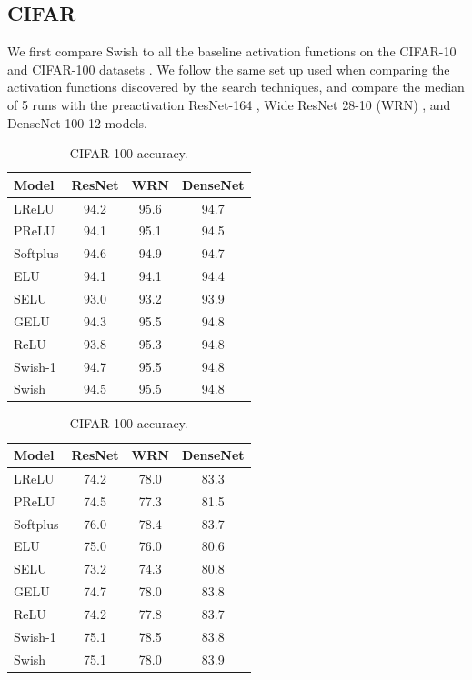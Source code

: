 \documentclass{article} %
\begin{document}
\subsection{CIFAR}
\label{ssec:experiments-cifar}

We first compare Swish to all the baseline activation functions on the CIFAR-10 and CIFAR-100 datasets \citep{krizhevsky2009learning}. We follow the same set up used when comparing the activation functions discovered by the search techniques, and compare the median of 5 runs with the preactivation ResNet-164 \citep{he2016identity}, Wide ResNet 28-10 (WRN) \citep{zagoruyko2016wide}, and DenseNet 100-12 \citep{huang2016densely} models.

\begin{table}[h!]
\centering
\small
\parbox{.45\linewidth}{
\begin{tabular}{lccc}
\toprule[0.25mm]
\bf{Model} & \bf{ResNet} & \bf{WRN} & \bf{DenseNet}  \\
\midrule
LReLU       & 94.2      & 95.6      & 94.7      \\
PReLU       & 94.1      & 95.1      & 94.5      \\
Softplus    & 94.6      & 94.9      & 94.7      \\
ELU         & 94.1      & 94.1      & 94.4      \\
SELU        & 93.0      & 93.2      & 93.9      \\
GELU        & 94.3      & 95.5      & 94.8      \\
\midrule
ReLU        & 93.8      & 95.3      & 94.8      \\
\midrule
Swish-1     & 94.7      & 95.5      & 94.8      \\
Swish       & 94.5      & 95.5      & 94.8      \\
\bottomrule[0.25mm]
\end{tabular}
\caption{CIFAR-10 accuracy.}
\label{table:cifar10-accuracy}
}
\hfill
\parbox{.45\linewidth}{
\begin{tabular}{lccc}
\toprule[0.25mm]
\bf{Model} & \bf{ResNet} & \bf{WRN} & \bf{DenseNet}  \\
\midrule
LReLU       & 74.2      & 78.0      & 83.3      \\
PReLU       & 74.5      & 77.3      & 81.5      \\
Softplus    & 76.0      & 78.4      & 83.7      \\
ELU         & 75.0      & 76.0      & 80.6      \\
SELU        & 73.2      & 74.3      & 80.8      \\
GELU        & 74.7      & 78.0      & 83.8      \\
\midrule
ReLU        & 74.2      & 77.8      & 83.7      \\
\midrule
Swish-1     & 75.1      & 78.5      & 83.8      \\
Swish       & 75.1      & 78.0      & 83.9      \\
\bottomrule[0.25mm]
\end{tabular}
\caption{CIFAR-100 accuracy.}
\label{table:cifar100-accuracy}
}
\end{table}
\end{document}
